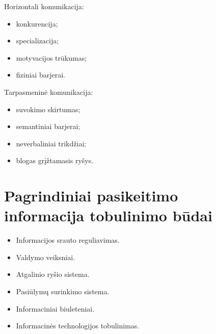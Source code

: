 Horizontali komunikacija:
\begin{itemize}
  \item konkurencija;
  \item specializacija;
  \item motyvacijos trūkumas;
  \item fiziniai barjerai.
\end{itemize}

Tarpasmeninė komunikacija:
\begin{itemize}
  \item suvokimo skirtumas;
  \item semantiniai barjerai;
  \item neverbaliniai trikdžiai;
  \item blogas grįžtamasis ryšys.
\end{itemize}

\section{Pagrindiniai pasikeitimo informacija tobulinimo būdai}

\begin{itemize}
  \item Informacijos srauto reguliavimas.
  \item Valdymo veiksniai.
  \item Atgalinio ryšio sistema.
  \item Pasiūlymų surinkimo sistema.
  \item Informaciniai biuleteniai.
  \item Informacinės technologijos tobulinimas.
\end{itemize}
